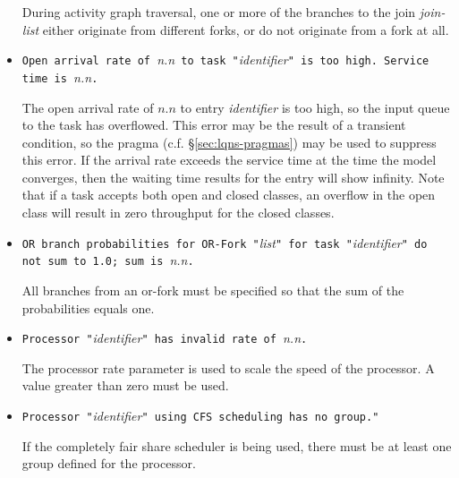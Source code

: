 \begin{itemize}
  During activity graph traversal, one or more of the
  branches to the join
  \emph{join-list} either originate from different forks, or do not
  originate from a fork at all.

\item \texttt{Open arrival rate of }\emph{n.n}\texttt{ to task
    "}\emph{identifier}\texttt{" is too high.  Service time is
  }\emph{n.n}\texttt{.}
  
  The open arrival rate of $n.n$ to entry
  \emph{identifier} is too high, so the input
  queue to the task has overflowed.  This error may be the result of a
  transient condition, so the  pragma
  (c.f. \S\ref{sec:lqns-pragmas}) may be used to suppress this error.
  If the arrival rate exceeds the service time at the time the model
  converges, then the waiting time results for the entry will show
  infinity.  Note that if a task accepts both open and
  closed classes, an overflow in
  the open class will result in zero throughput
  for the closed classes.

\item \texttt{OR branch probabilities for OR-Fork
    "}\emph{list}\texttt{" for task "}\emph{identifier}\texttt{"
    do not sum to 1.0; sum is }\emph{n.n}\texttt{.}
  
  All branches from an or-fork
  must be specified so that the sum of the
  probabilities equals one.

\item \texttt{Processor "}\emph{identifier}\texttt{" has invalid rate of }\emph{n.n}\texttt{.}
  
  The processor rate parameter is used to scale the speed of the processor.  A
  value greater than zero must be used.


\item \texttt{Processor "}\emph{identifier}\texttt{" using CFS scheduling has no group."}
  
  If the completely fair share scheduler is being used, there must
  be at least one group defined for the processor.


\end{itemize}
